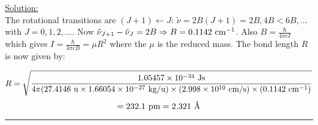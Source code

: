 \noindent
\underline{Solution:}\\

\noindent
The rotational transitions are $(J+1)\leftarrow J$: $\tilde{\nu} = 2B(J+1) = 2B, 4B< 6B, ...$ with $J = 0,1,2,...$. Now $\tilde{\nu}_{J+1} - \tilde{\nu}_J = 2B \Rightarrow B = 0.1142\textnormal{ cm}^{-1}$. Also $B = \frac{\hbar}{4\pi cI}$ which gives $I = \frac{\hbar}{4\pi cB} = \mu R^2$ where the $\mu$ is the reduced mass. The bond length $R$ is now given by:

$$R = \sqrt{\frac{1.05457\times 10^{-34}\textnormal{ Js}}{4\pi(27.4146\textnormal{ u}\times 1.66054\times 10^{-27}\textnormal{ kg/u})\times(2.998\times 10^{10}\textnormal{ cm/s})\times(0.1142\textnormal{ cm}^{-1})}}$$
$$ = 232.1\textnormal{ pm} = 2.321\textnormal{ \AA}$$

\hrule\vspace{0.5cm}



